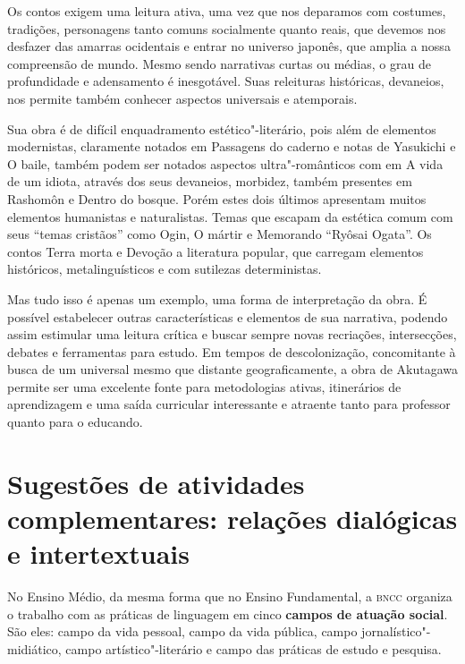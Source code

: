 \documentclass[12pt]{extarticle}
\begin{document}

Os contos exigem uma leitura ativa, uma vez que nos deparamos com
costumes, tradições, personagens tanto comuns socialmente quanto reais,
que devemos nos desfazer das amarras ocidentais e entrar no universo
japonês, que amplia a nossa compreensão de mundo. Mesmo sendo narrativas
curtas ou médias, o grau de profundidade e adensamento é inesgotável.
Suas releituras históricas, devaneios, nos permite também conhecer
aspectos universais e atemporais.

Sua obra é de difícil enquadramento estético"-literário, pois além de
elementos modernistas, claramente notados em Passagens do caderno e
notas de Yasukichi e O baile, também podem ser notados aspectos
ultra"-românticos com em A vida de um idiota, através dos seus devaneios,
morbidez, também presentes em Rashomôn e Dentro do bosque. Porém estes
dois últimos apresentam muitos elementos humanistas e naturalistas.
Temas que escapam da estética comum com seus ``temas cristãos'' como
Ogin, O mártir e Memorando ``Ryôsai Ogata''. Os contos Terra morta e
Devoção a literatura popular, que carregam elementos históricos,
metalinguísticos e com sutilezas deterministas.

Mas tudo isso é apenas um exemplo, uma forma de interpretação da obra. É
possível estabelecer outras características e elementos de sua
narrativa, podendo assim estimular uma leitura crítica e buscar sempre
novas recriações, intersecções, debates e ferramentas para estudo. Em
tempos de descolonização, concomitante à busca de um universal mesmo que
distante geograficamente, a obra de Akutagawa permite ser uma excelente
fonte para metodologias ativas, itinerários de aprendizagem e uma saída
curricular interessante e atraente tanto para professor quanto para o
educando.

\section{Sugestões de atividades complementares: relações dialógicas e
intertextuais}


No Ensino Médio, da mesma forma que no Ensino Fundamental, a \textsc{bncc}
organiza o trabalho com as práticas de linguagem em cinco \textbf{campos
de atuação social}. São eles: campo da vida pessoal, campo da vida
pública, campo jornalístico"-midiático, campo artístico"-literário e campo
das práticas de estudo e pesquisa.
\end{document}
